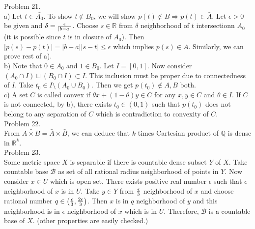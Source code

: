 Problem 21. \\

a) Let $t \in \bar{A_0}$. To show $t \notin B_0$, we will show $p(t) \notin B \Rightarrow p(t) \in \bar{A}$. Let $\epsilon >0$ be given and $\delta = {\epsilon \over \lvert b-a \rvert}$. Choose $s \in \mathbb{R}$ from $\delta$ neighborhood of $t$ intersectionn $A_0$ (it is possible since $t$ is in closure of $A_0$). Then $\lvert p(s) - p(t) \rvert = \lvert b-a \rvert \lvert s-t \rvert \leq \epsilon$ which implies $p(s) \in \bar{A}$. Similarly, we can prove rest of a). \\

b) Note that $0\in A_0$ and $1 \in B_0$. Let $I = \left [ 0, 1 \right ]$. Now consider $\left ( A_0 \cap I \right ) \sqcup \left ( B_0 \cap I \right ) \subset I$. This inclusion must be proper due to connectedness of $I$. Take $t_0 \in I \setminus \left ( A_0 \cup B_0 \right )$. Then we get $p(t_0) \notin A, B$ both. \\

c) A set $C$ is called convex if $\theta x + \left ( 1-\theta \right ) y \in C$ for any $x, y \in C$ and $\theta \in I$. If $C$ is not connected, by b), there exists $t_0 \in (0, 1)$ such that $p(t_0)$ does not belong to any separation of $C$ which is contradiction to convexity of $C$. \\

Problem 22. \\

From $\bar{A \times B} = \bar{A} \times \bar{B}$, we can deduce that $k$ times Cartesian product of $\mathbb{Q}$ is dense in $\mathbb{R}^k$. \\

Problem 23. \\

Some metric space $X$ is separable if there is countable dense subset $Y$ of $X$. Take countable base $\mathcal{B}$  as set of all rational radius neighborhood of points in $Y$. Now consider $x \in U$ which is open set. There exists positive real number $\epsilon$ such that $\epsilon$ neighborhood of $x$ is in $U$. Take $y \in Y$ from $\epsilon \over 3$ neighborhood of $x$ and choose rational number $q \in \left ( {\epsilon \over 3}, {2\epsilon \over 3} \right )$. Then $x$ is in $q$ neighborhood of $y$ and this neighborhood is in $\epsilon$ neighborhood of $x$ which is in $U$. Therefore, $\mathcal{B}$ is a countable base of $X$. (other properties are easily checked.)\\






